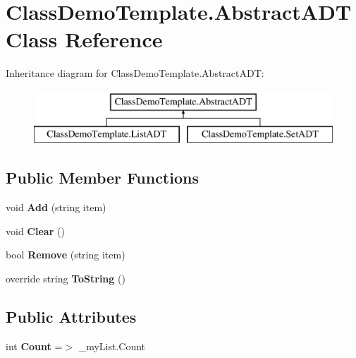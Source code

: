 \hypertarget{class_class_demo_template_1_1_abstract_a_d_t}{}\section{Class\+Demo\+Template.\+Abstract\+A\+DT Class Reference}
\label{class_class_demo_template_1_1_abstract_a_d_t}
Inheritance diagram for Class\+Demo\+Template.\+Abstract\+A\+DT\+:\begin{figure}[H]
\begin{center}
\leavevmode
\includegraphics[height=2.000000cm]{class_class_demo_template_1_1_abstract_a_d_t}
\end{center}
\end{figure}
\subsection*{Public Member Functions}
\begin{DoxyCompactItemize}
\item 
\mbox{\label{class_class_demo_template_1_1_abstract_a_d_t_af0c5fbf6d9728d75f4f1efc69012e686}} 
void {\bfseries Add} (string item)
\item 
\mbox{\label{class_class_demo_template_1_1_abstract_a_d_t_ab5a517f2e2564835cd6dbeb501b0fc26}} 
void {\bfseries Clear} ()
\item 
\mbox{\label{class_class_demo_template_1_1_abstract_a_d_t_a35f62e485cb92318b1213c95192c700b}} 
bool {\bfseries Remove} (string item)
\item 
\mbox{\label{class_class_demo_template_1_1_abstract_a_d_t_a9c11f797fb37eb0547c54f0c8b629f04}} 
override string {\bfseries To\+String} ()
\end{DoxyCompactItemize}
\subsection*{Public Attributes}
\begin{DoxyCompactItemize}
\item 
\mbox{\label{class_class_demo_template_1_1_abstract_a_d_t_aadb76f59bfffd33e9e6b25143990e0dc}} 
int {\bfseries Count} =$>$ \+\_\+my\+List.\+Count
\end{DoxyCompactItemize}
